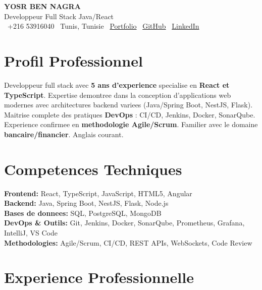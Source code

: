 \documentclass[10pt,a4paper]{article}
\begin{document}
\begin{center}
  {\Large\bfseries\color{primary} YOSR BEN NAGRA}\\[2pt]
  {\small\color{darkgray} Developpeur Full Stack Java/React}\\[3pt]
  {\footnotesize
    \faPhone\ +216 53916040 \quad
    \faMapMarker*\ Tunis, Tunisie \quad
    \faGlobe\ \href{https://portfolio-yosr.vercel.app/en}{Portfolio} \quad
    \faGithub\ \href{https://github.com/YosrBennagra}{GitHub} \quad
    \faLinkedin\ \href{https://www.linkedin.com/in/yosr-ben-nagra/}{LinkedIn}
  }
\end{center}

\vspace{3pt}

\section*{Profil Professionnel}
\vspace{1pt}
{\small
Developpeur full stack avec \textbf{5 ans d'experience} specialise en \textbf{React et TypeScript}. Expertise demontree dans la conception d'applications web modernes avec architectures backend variees (Java/Spring Boot, NestJS, Flask). Maitrise complete des pratiques \textbf{DevOps} : CI/CD, Jenkins, Docker, SonarQube. Experience confirmee en \textbf{methodologie Agile/Scrum}. Familier avec le domaine \textbf{bancaire/financier}. Anglais courant.
}

\vspace{5pt}

\section*{Competences Techniques}
\vspace{2pt}
{\small
\textbf{Frontend:} React, TypeScript, JavaScript, HTML5, Angular\\[2pt]
\textbf{Backend:} Java, Spring Boot, NestJS, Flask, Node.js\\[2pt]
\textbf{Bases de donnees:} SQL, PostgreSQL, MongoDB\\[2pt]
\textbf{DevOps \& Outils:} Git, Jenkins, Docker, SonarQube, Prometheus, Grafana, IntelliJ, VS Code\\[2pt]
\textbf{Methodologies:} Agile/Scrum, CI/CD, REST APIs, WebSockets, Code Review
}

\vspace{5pt}

\section*{Experience Professionnelle}
\vspace{2pt}
\end{document}

